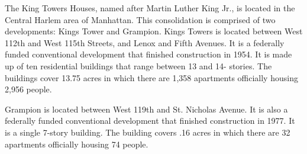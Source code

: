  

The King Towers Houses, named after Martin Luther King Jr., is located in the Central Harlem area of Manhattan. This consolidation is comprised of two developments: Kings Tower and Grampion. Kings Towers is located between West 112th and West 115th Streets, and Lenox and Fifth Avenues. It is a federally funded conventional development that finished construction in 1954. It is made up of ten residential buildings that range between 13 and 14- stories. The buildings cover 13.75 acres in which there are 1,358 apartments officially housing 2,956 people.  

 

Grampion is located between West 119th and St. Nicholas Avenue. It is also a federally funded conventional development that finished construction in 1977. It is a single 7-story building. The building covers .16 acres in which there are 32 apartments officially housing 74 people.  